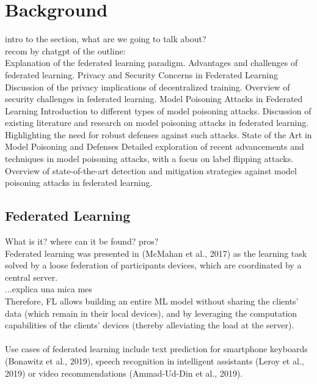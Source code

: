\section{Background} \label{sec:background}
intro to the section, what are we going to talk about?\\

recom by chatgpt of the outline:\\
Explanation of the federated learning paradigm.
Advantages and challenges of federated learning.
Privacy and Security Concerns in Federated Learning
Discussion of the privacy implications of decentralized training.
Overview of security challenges in federated learning.
Model Poisoning Attacks in Federated Learning
Introduction to different types of model poisoning attacks.
Discussion of existing literature and research on model poisoning attacks in federated learning.
Highlighting the need for robust defenses against such attacks.
State of the Art in Model Poisoning and Defenses
Detailed exploration of recent advancements and techniques in model poisoning attacks, with a focus on label flipping attacks.
Overview of state-of-the-art detection and mitigation strategies against model poisoning attacks in federated learning.
\subsection{Federated Learning}
What is it? where can it be found? pros?\\
Federated learning was presented in (McMahan et al., 2017) as the learning task solved by a loose federation of participants devices, which are coordinated by a central server.\\
...explica una mica mes\\
Therefore, FL allows building an entire ML model without sharing the clients’ data (which remain in their local devices), and by leveraging the computation capabilities of the clients’ devices (thereby alleviating the load at the server).\\\\


Use cases of federated learning include text prediction for smartphone keyboards (Bonawitz et al., 2019), speech recognition in intelligent assistants (Leroy et al., 2019) or video recommendations (Ammad-Ud-Din et al., 2019).\\\\




